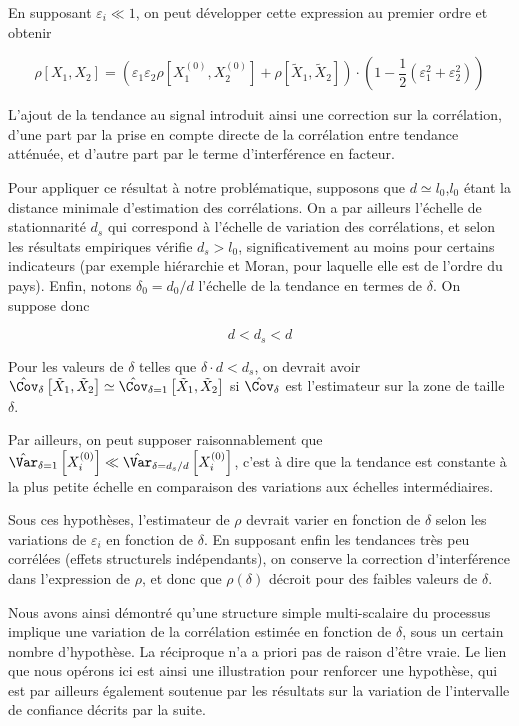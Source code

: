 En supposant $\varepsilon_i \ll 1$, on peut développer cette expression au premier ordre et obtenir

\begin{equation}
	\rho\left[X_1,X_2\right] = \left( \varepsilon_1 \varepsilon_2\rho\left[X_1^{(0)},X_2^{(0)}\right] + \rho\left[\tilde{X}_1,\tilde{X}_2\right]\right)\cdot\left(1 - \frac{1}{2}(\varepsilon_1^2 + \varepsilon_2^2)\right)
\end{equation}

L'ajout de la tendance au signal introduit ainsi une correction sur la corrélation, d'une part par la prise en compte directe de la corrélation entre tendance atténuée, et d'autre part par le terme d'interférence en facteur.

Pour appliquer ce résultat à notre problématique, supposons que $d \simeq l_0$,$l_0$ étant la distance minimale d'estimation des corrélations. On a par ailleurs l'échelle de stationnarité $d_s$ qui correspond à l'échelle de variation des corrélations, et selon les résultats empiriques vérifie $d_s > l_0$, significativement au moins pour certains indicateurs (par exemple hiérarchie et Moran, pour laquelle elle est de l'ordre du pays). Enfin, notons $\delta_0 = d_0/d$ l'échelle de la tendance en termes de $\delta$. On suppose donc

\[
d < d_s < d
\]

Pour les valeurs de $\delta$ telles que $\delta \cdot d < d_s$, on devrait avoir $\hat{\Cov}_{\delta}\left[\tilde{X}_1,\tilde{X}_2\right] \simeq \hat{\Cov}_{\delta = 1}\left[\tilde{X}_1,\tilde{X}_2\right]$ si $\hat{\Cov}_{\delta}$ est l'estimateur sur la zone de taille $\delta$.

Par ailleurs, on peut supposer raisonnablement que $\hat{\Var}_{\delta = 1}\left[X_i^{(0)}\right] \ll \hat{\Var}_{\delta = d_s / d}\left[X_i^{(0)}\right]$, c'est à dire que la tendance est constante à la plus petite échelle en comparaison des variations aux échelles intermédiaires.

Sous ces hypothèses, l'estimateur de $\rho$ devrait varier en fonction de $\delta$ selon les variations de $\varepsilon_i$ en fonction de $\delta$. En supposant enfin les tendances très peu corrélées (effets structurels indépendants), on conserve la correction d'interférence dans l'expression de $\rho$, et donc que $\rho(\delta)$ décroit pour des faibles valeurs de $\delta$.


Nous avons ainsi démontré qu'une structure simple multi-scalaire du processus implique une variation de la corrélation estimée en fonction de $\delta$, sous un certain nombre d'hypothèse. La réciproque n'a a priori pas de raison d'être vraie. Le lien que nous opérons ici est ainsi une illustration pour renforcer une hypothèse, qui est par ailleurs également soutenue par les résultats sur la variation de l'intervalle de confiance décrits par la suite.




